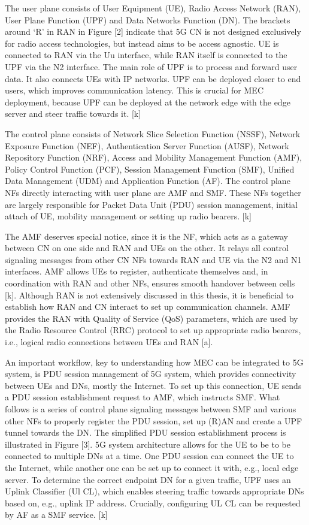 \documentclass[12pt,a4paper,twoside]{report}
\begin{document}
The user plane consists of User Equipment (UE), Radio Access Network (RAN), User Plane Function (UPF) and Data Networks Function (DN). The brackets around ‘R’ in RAN in Figure [2] indicate that 5G CN is not designed exclusively for radio access technologies, but instead aims to be access agnostic. UE is connected to RAN via the Uu interface, while RAN itself is connected to the UPF via the N2 interface. The main role of UPF is to process and forward user data. It also connects UEs with IP networks. UPF can be deployed closer to end users, which improves communication latency. This is crucial for MEC deployment, because UPF can be deployed at the network edge with the edge server and steer traffic towards it. [k] 

The control plane consists of Network Slice Selection Function (NSSF), Network Exposure Function (NEF), Authentication Server Function (AUSF), Network Repository Function (NRF), Access and Mobility Management Function (AMF), Policy Control Function (PCF), Session Management Function (SMF), Unified Data Management (UDM) and Application Function (AF). The control plane NFs directly interacting with user plane are AMF and SMF. These NFs together are largely responsible for Packet Data Unit (PDU) session management, initial attach of UE, mobility management or setting up radio bearers. [k] 
  
The AMF deserves special notice, since it is the NF, which acts as a gateway between CN on one side and RAN and UEs on the other. It relays all control signaling messages from other CN NFs towards RAN and UE via the N2 and N1 interfaces. AMF allows UEs to register, authenticate themselves and, in coordination with RAN and other NFs, ensures smooth handover between cells [k]. Although RAN is not extensively discussed in this thesis, it is beneficial to establish how RAN and CN interact to set up communication channels. AMF provides the RAN with Quality of Service (QoS) parameters, which are used by the Radio Resource Control (RRC) protocol to set up appropriate radio bearers, i.e., logical radio connections between UEs and RAN [a]. 
  
An important workflow, key to understanding how MEC can be integrated to 5G system, is PDU session management of 5G system, which  provides connectivity between UEs and DNs, mostly the Internet. To set up this connection, UE sends a PDU session establishment request to AMF, which instructs SMF. What follows is a series of control plane signaling messages between SMF and various other NFs to properly register the PDU session, set up (R)AN and create a UPF tunnel towards the DN. The simplified PDU session establishment process is illustrated in Figure [3]. 5G system architecture allows for the UE to be to be connected to multiple DNs at a time. One PDU session can connect the UE to the Internet, while another one can be set up to connect it with, e.g., local edge server. To determine the correct endpoint DN for a given traffic, UPF uses an Uplink Classifier (Ul CL), which enables steering traffic towards appropriate DNs based on, e.g., uplink IP address. Crucially, configuring UL CL can be requested by AF as a SMF service. [k] 
\end{document}
